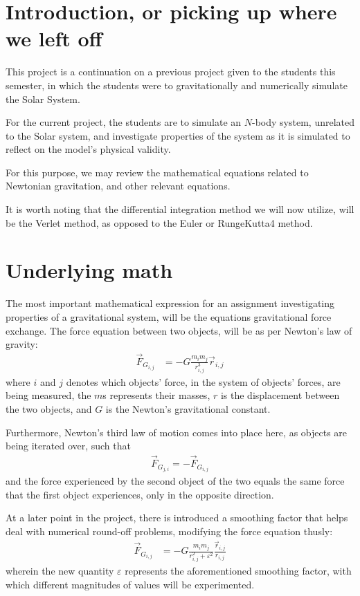 \documentclass[11pt,a4paper,notitlepage,twocolumn]{article}
\begin{document}
\section{Introduction, or picking up where we left off}
This project is a continuation on a previous project given to the students this semester, in which the students were to gravitationally and numerically simulate the Solar System.

For the current project, the students are to simulate an $N$-body system, unrelated to the Solar system, and investigate properties of the system as it is simulated to reflect on the model's physical validity.

For this purpose, we may review the mathematical equations related to Newtonian gravitation, and other relevant equations.

It is worth noting that the differential integration method we will now utilize, will be the Verlet method, as opposed to the Euler or RungeKutta4 method.

\section{Underlying math}
The most important mathematical expression for an assignment investigating properties of a gravitational system, will be the equations gravitational force exchange. The force equation between two objects, will be as per Newton's law of gravity:
\begin{align}\label{eq:gravlaw}
\vec{F}_{G_{i,j}} &= -G\frac{m_i m_j}{r^3_{i,j}}\vec{r}_{i,j}
\end{align}
where $i$ and $j$ denotes which objects' force, in the system of objects' forces, are being measured, the $m$s represents their masses, $r$ is the displacement between the two objects, and $G$ is the Newton's gravitational constant.

Furthermore, Newton's third law of motion comes into place here, as objects are being iterated over, such that
\begin{align}\label{eq:thirdlaw}
\vec{F}_{G_{j,i}} = -\vec{F}_{G_{i,j}}
\end{align}
and the force experienced by the second object of the two equals the same force that the first object experiences, only in the opposite direction.

At a later point in the project, there is introduced a smoothing factor that helps deal with numerical round-off problems, modifying the force equation thusly:
\begin{align}\label{eq:modgravlaw}
\vec{F}_{G_{i,j}} &= -G\frac{m_i m_j}{r^2_{i,j}+\varepsilon^2}\frac{\vec{r}_{i,j}}{r_{i,j}}
\end{align}
wherein the new quantity $\varepsilon$ represents the aforementioned smoothing factor, with which different magnitudes of values will be experimented.
\end{document}
